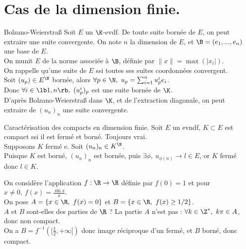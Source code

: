 \documentclass[11pt]{article}
\begin{document}
\vspace*{-0.7cm}

\section{Cas de la dimension finie.}

\begin{thm}{Bolzano-Weierstraß}{}
    Soit $E$ un $\K$-evdf. De toute suite bornée de $E$, on peut extraire une suite convergente.
    \tcblower
    On note $n$ la dimension de $E$, et $\B=(e_1,...,e_n)$ une base de $E$.\\
    On munit $E$ de la norme associée à $\B$, définie par $\|x\|=\max(|x_i|)$.\\
    On rappelle qu'une suite de $E$  ssi toutes ses suites coordonnées convergent.\\
    Soit $(u_p)\in E^\N$ bornée, alors $\forall p \in \N, ~ u_p = \sum_{i=1}^nu_p^ie_i$.\\
    Donc $\forall i \in \lb1,n\rb, ~ (u_p^i)_p$ est une suite bornée de $\K$.\\
    D'après Bolzano-Weierstraß dans $\K$, et de l'extraction diagonale, on peut extraire de $(u_n)_n$ une suite convergente.
\end{thm}

\vspace*{-0.4cm}

\begin{thm}{Caractérisation des compacts en dimension finie.}{}
    Soit $E$ un evndf, $K\subset E$ est compact ssi il est fermé et borné.
    \tcblower
    \boxed{\ra} Toujours vrai.\\
    \boxed{\la} Supposons $K$ fermé e. Soit $(u_n)_n\in K^\N$.\\
    Puisque $K$ est borné, $(u_n)_n$ est bornée, puis $\exists \phi, ~ u_{\phi(n)}\to l\in E$, or $K$ fermé donc $l\in K$.
\end{thm}

\begin{ex}{}{}
    On considère l'application $f:\R\to\R$ définie par $f(0)=1$ et pour $x\neq0, ~ f(x)=\frac{\sin x}{x}$.\\
    On pose $A=\{x\in\R, ~ f(x) = 0\}$ et $B=\{x \in \R, ~ f(x) \geq 1/2\}$.\\
    $A$ et $B$ sont-elles des parties  de $\R$ ?
    \tcblower
    La partie $A$ n'est pas  : $\forall k \in \Z^*, ~ k\pi \in A$, donc non compact.\\
    On a $B=f^{-1}([\frac{1}{2},+\infty[)$ donc image réciproque d'un fermé, et $B$ borné, donc compact.
\end{ex}
\end{document}
